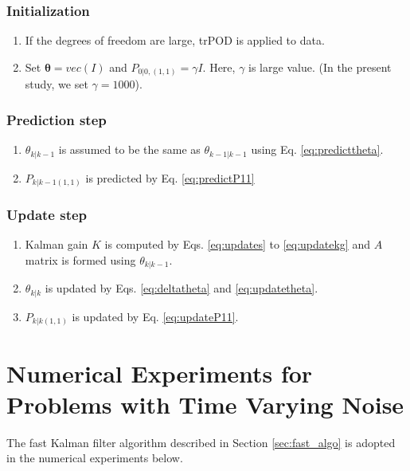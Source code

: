 \documentclass[aip,graphicx]{revtex4-1}
\begin{document}
\subsubsection*{Initialization}
\begin{enumerate}
    \item If the degrees of freedom are large, trPOD is applied to data.
    \item Set $\bm{\theta}=vec(I)$ and $P_{0|0,(1,1)}=\gamma I$. Here, $\gamma$ is large value. (In the present study, we set $\gamma=1000$).
\end{enumerate}

\subsubsection*{Prediction step}
\begin{enumerate}
    \item $\theta_{k|k-1}$ is assumed to be the same as $\theta_{k-1|k-1}$ using Eq. \ref{eq:predicttheta}.
    \item $P_{k|k-1(1,1)}$ is predicted by Eq. \ref{eq:predictP11}
\end{enumerate}

\subsubsection*{Update step}
\begin{enumerate}
    \item Kalman gain $K$ is computed by Eqs. \ref{eq:updates} to \ref{eq:updatekg} and $A$ matrix is formed using $\theta_{k|k-1}$. 
    \item $\theta_{k|k}$ is updated by Eqs. \ref{eq:deltatheta} and \ref{eq:updatetheta}.
    \item $P_{k|k(1,1)}$ is updated by Eq. \ref{eq:updateP11}.
\end{enumerate}




\section{Numerical Experiments for Problems with Time Varying Noise }
\label{sec:NETVN}
The fast Kalman filter algorithm described in Section \ref{sec:fast_algo} is adopted in the numerical experiments below. 
\end{document}
